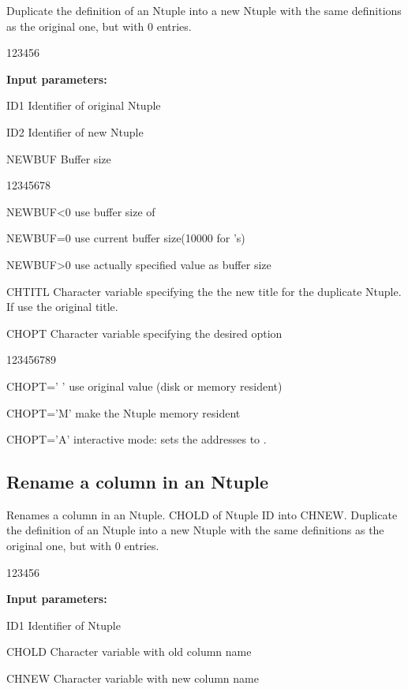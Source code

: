 
\Action
Duplicate the definition of an Ntuple into a new Ntuple with
the same definitions as the original one, but with 0 entries.

\begin{DLttc}{123456}
\item[{\rm\bf Input parameters:}]
\item[ID1]  Identifier of original Ntuple
\item[ID2]  Identifier of new Ntuple
\item[NEWBUF] Buffer size
  \begin{DLttc}{12345678}
    \item[NEWBUF<0] use buffer size of 
    \item[NEWBUF=0] use current buffer size(10000 for \RWN's)
    \item[NEWBUF>0] use actually specified value as buffer size
  \end{DLttc}
\item[CHTITL] Character variable specifying the the new title
              for the duplicate Ntuple.
              If  use the original title.
\item[CHOPT]  Character variable specifying the desired option
  \begin{DLttc}{123456789}
    \item[CHOPT=' '] use original value (disk or memory resident)
    \item[CHOPT='M'] make the Ntuple memory resident
    \item[CHOPT='A'] interactive mode: sets the addresses to .
  \end{DLttc}
\end{DLttc}

\subsection*{Rename a column in an Ntuple}


\Action
Renames a column in an Ntuple.
CHOLD of Ntuple ID into CHNEW.
Duplicate the definition of an Ntuple into a new Ntuple with
the same definitions as the original one, but with 0 entries.

\begin{DLttc}{123456}
\item[{\rm\bf Input parameters:}]
\item[ID1]  Identifier of Ntuple
\item[CHOLD] Character variable with old column name
\item[CHNEW] Character variable with new column name
\end{DLttc}

